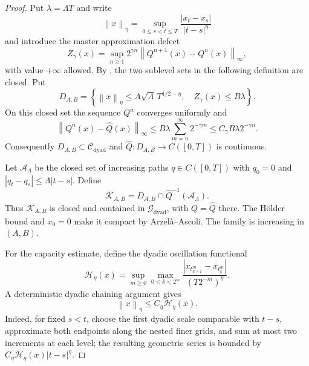 \documentclass[11pt,reqno]{amsart}
\theoremstyle{plain}
\theoremstyle{definition}
\newcommand{\cC}{\mathcal C}
\newcommand{\cG}{\mathcal G}
\newcommand{\cK}{\mathcal K}
\newcommand{\norm}[1]{\left\lVert #1\right\rVert}
\newcommand{\abs}[1]{\left\lvert #1\right\rvert}
\begin{document}
\begin{proof}
Put \(\lambda=\Lambda T\) and write
\[
  \norm{x}_\eta
  =\sup_{0\le s<t\le T}
    \frac{\abs{x_t-x_s}}{\abs{t-s}^\eta}
\]
and introduce the master approximation defect
\begin{equation}\label{eq:master-defect}
  Z_\gamma(x)
  =\sup_{n\ge1}
    2^{\gamma n}\norm{Q^{n+1}(x)-Q^n(x)}_\infty,
\end{equation}
with value \(+\infty\) allowed.  By
, the two sublevel sets in the following
definition are closed.  Put
\[
  D_{A,B}
  =\left\{
    \norm{x}_\eta\le A\sqrt\Lambda\,T^{1/2-\eta},\quad
    Z_\gamma(x)\le B\lambda
  \right\}.
\]
On this closed set the sequence \(Q^n\) converges uniformly and
\begin{equation}\label{eq:tail-master-defect}
  \norm{Q^n(x)-\widehat Q(x)}_\infty
  \le
  B\lambda\sum_{m=n}^\infty2^{-\gamma m}
  \le C_\gamma B\lambda2^{-\gamma n}.
\end{equation}
Consequently \(D_{A,B}\subset\cC_{\mathrm{dyad}}\) and
\(\widehat Q:D_{A,B}\to C([0,T])\) is continuous.

Let \(\mathcal A_\Lambda\) be the closed set of increasing paths
\(q\in C([0,T])\) with \(q_0=0\) and
\(\abs{q_t-q_s}\le\Lambda\abs{t-s}\).  Define
\begin{equation}\label{eq:explicit-core}
  \cK_{A,B}
  =D_{A,B}\cap \widehat Q^{-1}(\mathcal A_\Lambda).
\end{equation}
Thus \(\cK_{A,B}\) is closed and contained in \(\cG_{\mathrm{dyad}}\), with
\(Q=\widehat Q\) there.  The H\"older bound and \(x_0=0\) make it compact by
Arzel\`a--Ascoli.  The family is increasing in \((A,B)\).

For the capacity estimate, define the dyadic oscillation functional
\[
  \mathscr H_\eta(x)
  =
  \sup_{m\ge0}\max_{0\le k<2^m}
  \frac{
    \abs{x_{t_{k+1}^m}-x_{t_k^m}}
  }{(T2^{-m})^\eta}.
\]
A deterministic dyadic chaining argument gives
\begin{equation}\label{eq:dyadic-chaining-holder}
  \norm{x}_\eta\le C_\eta\mathscr H_\eta(x).
\end{equation}
Indeed, for fixed \(s<t\), choose the first dyadic scale comparable with
\(t-s\), approximate both endpoints along the nested finer grids, and sum at
most two increments at each level; the resulting geometric series is bounded
by \(C_\eta\mathscr H_\eta(x)\abs{t-s}^\eta\).


\end{proof}
\end{document}
